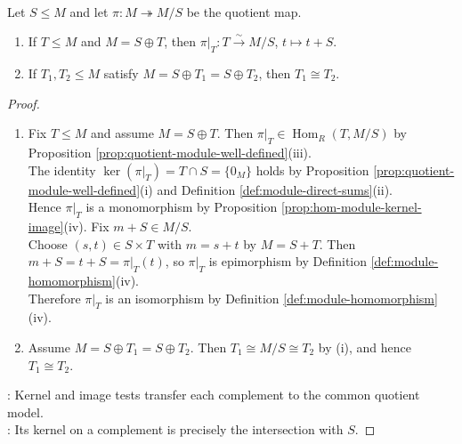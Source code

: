 \begin{theorem} \label{thm:complements-and-quotients-modules} \\
Let $S\leq M$ and let $\pi:M\twoheadrightarrow M/S$ be the quotient map.
\begin{enumerate}[label=(\roman*)]
\setlength{\itemsep}{0pt}
\item If $T\leq M$ and $M=S\oplus T$, then $\pi|_T:T\xrightarrow{\sim}M/S$, $t\mapsto t+S$.
\item If $T_1,T_2\leq M$ satisfy $M=S\oplus T_1=S\oplus T_2$, then $T_1\cong T_2$.
\end{enumerate}
\begin{proof}
\begin{enumerate}[label=(\roman*)]
\setlength{\itemsep}{0pt}
\item Fix $T\leq M$ and assume $M=S\oplus T$. Then $\pi|_T\in\operatorname{Hom}_R(T,M/S)$ by Proposition \ref{prop:quotient-module-well-defined}(iii).\\
The identity $\ker(\pi|_T)=T\cap S=\{0_M\}$ holds by Proposition \ref{prop:quotient-module-well-defined}(i) and Definition \ref{def:module-direct-sums}(ii).\\
Hence $\pi|_T$ is a monomorphism by Proposition \ref{prop:hom-module-kernel-image}(iv). Fix $m+S\in M/S$.\\
Choose $(s,t)\in S\times T$ with $m=s+t$ by $M=S+T$. Then $m+S=t+S=\pi|_T(t)$, so $\pi|_T$ is epimorphism by Definition \ref{def:module-homomorphism}(iv).\\
Therefore $\pi|_T$ is an isomorphism by Definition \ref{def:module-homomorphism}(iv).
\item Assume $M=S\oplus T_1=S\oplus T_2$. Then $T_1\cong M/S\cong T_2$ by (i), and hence $T_1\cong T_2$.
\end{enumerate}
: Kernel and image tests transfer each complement to the common quotient model.\\
: Its kernel on a complement is precisely the intersection with $S$.
\end{proof}
\end{theorem}
